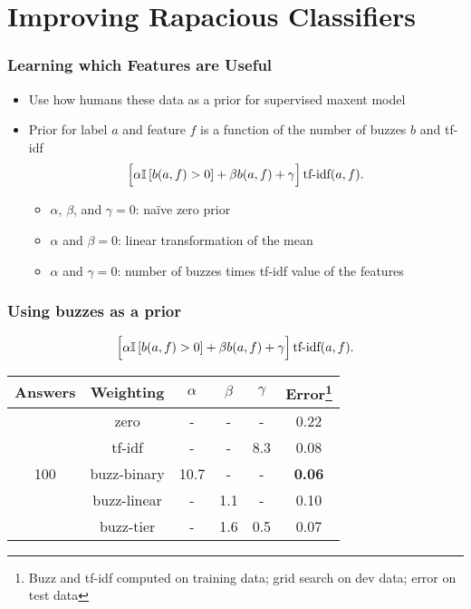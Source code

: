 

\section{Improving Rapacious Classifiers}

\begin{frame}
	\frametitle{Learning which Features are Useful}

	\begin{itemize}
		\item Use how humans these data as a prior for supervised maxent model~\cite{daume-04}
		\item Prior for label $a$ and feature $f$ is a function of the number of buzzes $b$ and tf-idf~\cite{salton-68}
\begin{equation}
  \left[ \vphantom{\frac{a}{b}}\alpha \ind{ b(a,f) > 0} + \beta b(a,f) + \gamma
  \right] \mbox{tf-idf}(a,f) .
\label{eq:meanweight}
\end{equation}
		\begin{itemize}
			\item $\alpha$, $\beta$, and $\gamma = 0$: na\"ive zero prior
			\item $\alpha$ and $\beta = 0$: linear transformation of the mean
			\item $\alpha$ and $\gamma = 0$: number of buzzes times tf-idf value of the features
		\end{itemize}

	\end{itemize}

\end{frame}

\begin{frame}
	\frametitle{Using buzzes as a prior}

\begin{equation*}
  \left[ \vphantom{\frac{a}{b}}\alpha \ind{ b(a,f) > 0} + \beta b(a,f) + \gamma
  \right] \mbox{tf-idf}(a,f) .
\end{equation*}

\begin{center}
\begin{tabular}{cccccc}
Answers & Weighting & $\alpha$ & $\beta$ & $\gamma$ & Error\footnote{Buzz and tf-idf computed on training data; grid search on dev data; error on test data} \\
\hline
\multirow{5}{*}{100} & zero & - & - & - & 0.22 \\
& tf-idf & - & - & 8.3 & 0.08 \\
&  buzz-binary & 10.7 & - & - & {\bf 0.06} \\
&  buzz-linear & - &  1.1 & - & 0.10 \\
& buzz-tier & - & 1.6 & 0.5 & 0.07 \\
\hline
\end{tabular}
\end{center}
\end{frame}


